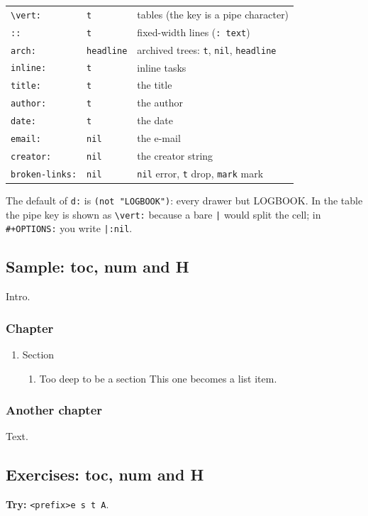 \begin{center}
\begin{tabular}{lll}
\texttt{\textbackslash{}vert:} & \texttt{t} & tables (the key is a pipe character)\\
\texttt{::} & \texttt{t} & fixed-width lines (\texttt{: text})\\
\texttt{arch:} & \texttt{headline} & archived trees: \texttt{t}, \texttt{nil}, \texttt{headline}\\
\texttt{inline:} & \texttt{t} & inline tasks\\
\texttt{title:} & \texttt{t} & the title\\
\texttt{author:} & \texttt{t} & the author\\
\texttt{date:} & \texttt{t} & the date\\
\texttt{email:} & \texttt{nil} & the e-mail\\
\texttt{creator:} & \texttt{nil} & the creator string\\
\texttt{broken-links:} & \texttt{nil} & \texttt{nil} error, \texttt{t} drop, \texttt{mark} mark\\
\end{tabular}
\end{center}

The default of \texttt{d:} is \texttt{(not "LOGBOOK")}: every drawer but LOGBOOK. In
the table the pipe key is shown as \texttt{\textbackslash{}vert:} because a bare \texttt{|} would
split the cell; in \texttt{\#+OPTIONS:} you write \texttt{|:nil}.
\subsection{Sample: toc, num and H}
\label{sec:orgd5de3e7}
Intro.
\subsubsection{Chapter}
\label{sec:org925a93b}
\begin{enumerate}
\item Section
\label{sec:org84cb207}
\begin{enumerate}
\item Too deep to be a section
\label{sec:org8dacc29}
This one becomes a list item.
\end{enumerate}
\end{enumerate}
\subsubsection{Another chapter}
\label{sec:org1858b08}
Text.
\subsection{Exercises: toc, num and H}
\label{sec:orgf5f9677}
\textbf{Try:} \texttt{<prefix>e s t A}.

